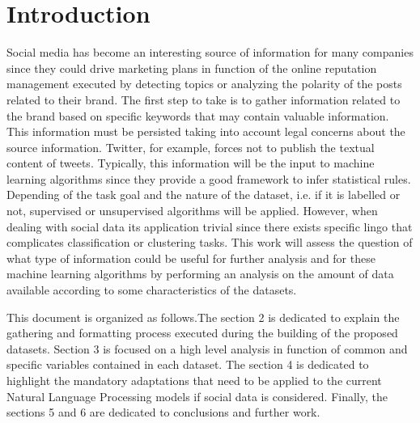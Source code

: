 \section{Introduction}
\par Social media has become an interesting source of information for many companies since they could drive marketing plans in function of the online reputation management executed by detecting topics or analyzing the polarity of the posts related to their brand. The first step to take is to gather information related to the brand based on specific keywords that may contain valuable information. This information must be persisted taking into account legal concerns about the source information. Twitter, for example, forces not to publish the textual content of tweets. Typically, this information will be the input to machine learning algorithms since they provide a good framework to infer statistical rules. Depending of the task goal and the nature of the dataset, i.e. if it is labelled or not, supervised or unsupervised algorithms will be applied. However, when dealing with social data its application trivial since there exists specific lingo that complicates classification or clustering tasks. This work will assess the question of what type of information could be useful for further analysis and for these machine learning algorithms by performing an analysis on the amount of data available according to some characteristics of the datasets.

\par This document is organized as follows.The section 2 is dedicated to explain the gathering and formatting process executed during the building of the proposed datasets. Section 3 is focused on a high level analysis in function of common and specific variables contained in each dataset. The section 4 is dedicated to highlight the mandatory adaptations that need to be applied to the current Natural Language Processing models if social data is considered. Finally, the sections 5 and 6 are dedicated to conclusions and further work.